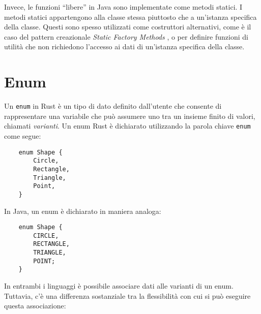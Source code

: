 Invece, le funzioni ``libere'' in Java sono implementate come metodi statici. I metodi statici appartengono alla classe stessa piuttosto che a un'istanza specifica della classe. Questi sono spesso utilizzati come costruttori alternativi, come è il caso del pattern creazionale \textit{Static Factory Methods} \cite{gamma-design-patterns}, o per definire funzioni di utilità che non richiedono l'accesso ai dati di un'istanza specifica della classe. 
\section{Enum}
\label{sec:enums}
Un \texttt{enum} in Rust è un tipo di dato definito dall'utente che consente di rappresentare una variabile che può assumere uno tra un insieme finito di valori, chiamati \textit{varianti}. Un enum Rust è dichiarato utilizzando la parola chiave \texttt{enum} come segue:
\begin{verbatim}
    enum Shape {
        Circle,
        Rectangle,
        Triangle,
        Point,  
    }
\end{verbatim}
In Java, un enum è dichiarato in maniera analoga:
\begin{verbatim}
    enum Shape {
        CIRCLE,
        RECTANGLE,
        TRIANGLE,
        POINT; 
    }
\end{verbatim}
In entrambi i linguaggi è possibile associare dati alle varianti di un enum. Tuttavia, c'è una differenza sostanziale tra la flessibilità con cui si può eseguire questa associazione:
